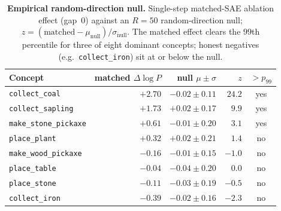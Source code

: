 \documentclass[11pt]{article}
\newcommand{\achname}[1]{\texttt{#1}}
\begin{document}
\begin{table}[h]
\centering
\caption{\textbf{Empirical random-direction null.} Single-step matched-SAE ablation effect (gap~0) against an $R{=}50$ random-direction null; $z=(\text{matched}-\mu_{\text{null}})/\sigma_{\text{null}}$. The matched effect clears the $99$th percentile for three of eight dominant concepts; honest negatives (e.g.\ \achname{collect\_iron}) sit at or below the null.}\label{stab:null}
\begin{tabular}{@{}lrrrc@{}}
\toprule
Concept & matched $\Delta\log P$ & null $\mu\pm\sigma$ & $z$ & $>p_{99}$ \\
\midrule
\achname{collect\_coal}        & $+2.70$ & $-0.02\pm0.11$ & $24.2$ & yes \\
\achname{collect\_sapling}     & $+1.73$ & $+0.02\pm0.17$ & $9.9$  & yes \\
\achname{make\_stone\_pickaxe} & $+0.61$ & $-0.01\pm0.20$ & $3.1$  & yes \\
\achname{place\_plant}         & $+0.32$ & $+0.02\pm0.21$ & $1.4$  & no \\
\achname{make\_wood\_pickaxe}  & $-0.16$ & $-0.01\pm0.15$ & $-1.0$ & no \\
\achname{place\_table}         & $-0.04$ & $-0.04\pm0.20$ & $0.0$  & no \\
\achname{place\_stone}         & $-0.11$ & $-0.03\pm0.19$ & $-0.5$ & no \\
\achname{collect\_iron}        & $-0.39$ & $-0.02\pm0.16$ & $-2.3$ & no \\
\bottomrule
\end{tabular}
\end{table}
\end{document}
